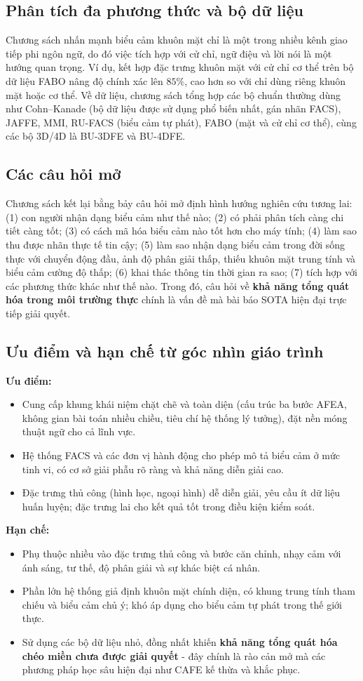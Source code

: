 \subsection{Phân tích đa phương thức và bộ dữ liệu}
Chương sách nhấn mạnh biểu cảm khuôn mặt chỉ là một trong nhiều kênh giao tiếp phi ngôn ngữ, do đó việc tích hợp với cử chỉ, ngữ điệu và lời nói là một hướng quan trọng. Ví dụ, kết hợp đặc trưng khuôn mặt với cử chỉ cơ thể trên bộ dữ liệu FABO nâng độ chính xác lên $85\%$, cao hơn so với chỉ dùng riêng khuôn mặt hoặc cơ thể. Về dữ liệu, chương sách tổng hợp các bộ chuẩn thường dùng như Cohn--Kanade (bộ dữ liệu được sử dụng phổ biến nhất, gán nhãn FACS), JAFFE, MMI, RU-FACS (biểu cảm tự phát), FABO (mặt và cử chỉ cơ thể), cùng các bộ 3D/4D là BU-3DFE và BU-4DFE.

\subsection{Các câu hỏi mở}
Chương sách kết lại bằng bảy câu hỏi mở định hình hướng nghiên cứu tương lai: (1) con người nhận dạng biểu cảm như thế nào; (2) có phải phân tích càng chi tiết càng tốt; (3) có cách mã hóa biểu cảm nào tốt hơn cho máy tính; (4) làm sao thu được nhãn thực tế tin cậy; (5) làm sao nhận dạng biểu cảm trong đời sống thực với chuyển động đầu, ảnh độ phân giải thấp, thiếu khuôn mặt trung tính và biểu cảm cường độ thấp; (6) khai thác thông tin thời gian ra sao; (7) tích hợp với các phương thức khác như thế nào. Trong đó, câu hỏi về \textbf{khả năng tổng quát hóa trong môi trường thực} chính là vấn đề mà bài báo SOTA hiện đại trực tiếp giải quyết.

\subsection{Ưu điểm và hạn chế từ góc nhìn giáo trình}
\textbf{Ưu điểm:}
\begin{itemize}
    \item Cung cấp khung khái niệm chặt chẽ và toàn diện (cấu trúc ba bước AFEA, không gian bài toán nhiều chiều, tiêu chí hệ thống lý tưởng), đặt nền móng thuật ngữ cho cả lĩnh vực.
    \item Hệ thống FACS và các đơn vị hành động cho phép mô tả biểu cảm ở mức tinh vi, có cơ sở giải phẫu rõ ràng và khả năng diễn giải cao.
    \item Đặc trưng thủ công (hình học, ngoại hình) dễ diễn giải, yêu cầu ít dữ liệu huấn luyện; đặc trưng lai cho kết quả tốt trong điều kiện kiểm soát.
\end{itemize}
\textbf{Hạn chế:}
\begin{itemize}
    \item Phụ thuộc nhiều vào đặc trưng thủ công và bước căn chỉnh, nhạy cảm với ánh sáng, tư thế, độ phân giải và sự khác biệt cá nhân.
    \item Phần lớn hệ thống giả định khuôn mặt chính diện, có khung trung tính tham chiếu và biểu cảm chủ ý; khó áp dụng cho biểu cảm tự phát trong thế giới thực.
    \item Sử dụng các bộ dữ liệu nhỏ, đồng nhất khiến \textbf{khả năng tổng quát hóa chéo miền chưa được giải quyết} - đây chính là rào cản mở mà các phương pháp học sâu hiện đại như CAFE kế thừa và khắc phục.
\end{itemize}

